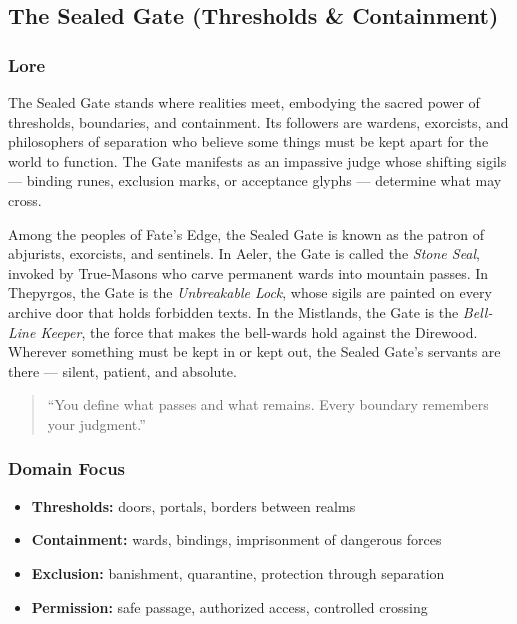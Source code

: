 
\subsection{The Sealed Gate (Thresholds \& Containment)}

\subsubsection*{Lore}
The Sealed Gate stands where realities meet, embodying the sacred power of thresholds, boundaries, and containment. Its followers are wardens, exorcists, and philosophers of separation who believe some things must be kept apart for the world to function. The Gate manifests as an impassive judge whose shifting sigils --- binding runes, exclusion marks, or acceptance glyphs --- determine what may cross.

Among the peoples of Fate's Edge, the Sealed Gate is known as the patron of abjurists, exorcists, and sentinels. In Aeler, the Gate is called the \textit{Stone Seal}, invoked by True-Masons who carve permanent wards into mountain passes. In Thepyrgos, the Gate is the \textit{Unbreakable Lock}, whose sigils are painted on every archive door that holds forbidden texts. In the Mistlands, the Gate is the \textit{Bell-Line Keeper}, the force that makes the bell-wards hold against the Direwood. Wherever something must be kept in or kept out, the Sealed Gate's servants are there --- silent, patient, and absolute.

\begin{quote}
``You define what passes and what remains. Every boundary remembers your judgment.''
\end{quote}

\subsubsection*{Domain Focus}
\begin{itemize}
  \item \textbf{Thresholds:} doors, portals, borders between realms
  \item \textbf{Containment:} wards, bindings, imprisonment of dangerous forces
  \item \textbf{Exclusion:} banishment, quarantine, protection through separation
  \item \textbf{Permission:} safe passage, authorized access, controlled crossing
\end{itemize}

